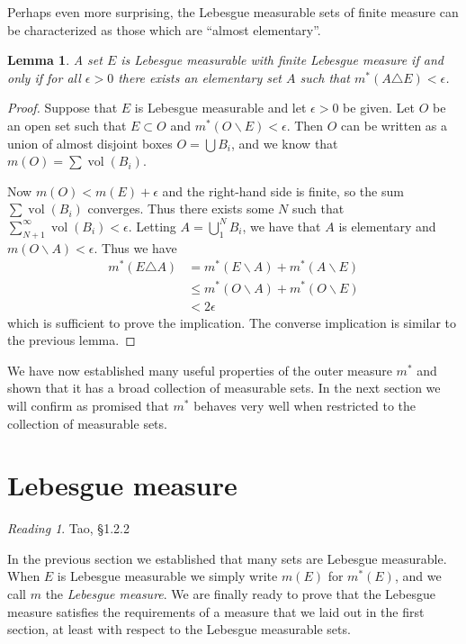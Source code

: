 \documentclass[11pt,oneside]{amsbook}
\renewcommand{\setminus}{\smallsetminus}
\DeclareMathOperator{\vol}{vol}
\theoremstyle{definition}
\theoremstyle{plain}
\newtheorem{lem}[thm]{Lemma}
\theoremstyle{definition}
\theoremstyle{remark}
\newtheorem*{reading}{Reading}
\numberwithin{equation}{section}
\numberwithin{figure}{section}
\begin{document}
Perhaps even more surprising, the Lebesgue measurable sets of finite measure can be characterized as those which are ``almost elementary''.

\begin{lem}
  A set $E$ is Lebesgue measurable with finite Lebesgue measure if and only if for all $\epsilon>0$ there exists an elementary set $A$ such that $m^*(A\triangle E)<\epsilon$.
\end{lem}

\begin{proof}
  Suppose that $E$ is Lebesgue measurable and let $\epsilon>0$ be given. Let $O$ be an open set such that $E\subset O$ and $m^*(O\setminus E)<\epsilon$. Then $O$ can be written as a union of almost disjoint boxes $O=\bigcup B_i$, and we know that $m(O)=\sum\vol(B_i)$.

  Now $m(O)<m(E)+\epsilon$ and the right-hand side is finite, so the sum $\sum\vol(B_i)$ converges. Thus there exists some $N$ such that $\sum_{N+1}^\infty\vol(B_i)<\epsilon$. Letting $A=\bigcup_1^NB_i$, we have that $A$ is elementary and $m(O\setminus A)<\epsilon$. Thus we have
  \begin{align*}
    m^*(E\triangle A)&=m^*(E\setminus A)+m^*(A\setminus E)\\
                     &\leq m^*(O\setminus A)+m^*(O\setminus E)\\
                     &<2\epsilon
  \end{align*}
  which is sufficient to prove the implication. The converse implication is similar to the previous lemma.
\end{proof}

We have now established many useful properties of the outer measure $m^*$ and shown that it has a broad collection of measurable sets. In the next section we will confirm as promised that $m^*$ behaves very well when restricted to the collection of measurable sets.


\section{Lebesgue measure}

\begin{reading}
  Tao, \S 1.2.2
\end{reading}

In the previous section we established that many sets are Lebesgue measurable. When $E$ is Lebesgue measurable we simply write $m(E)$ for $m^*(E)$, and we call $m$ the \emph{Lebesgue measure}. We are finally ready to prove that the Lebesgue measure satisfies the requirements of a measure that we laid out in the first section, at least with respect to the Lebesgue measurable sets.
\end{document}
